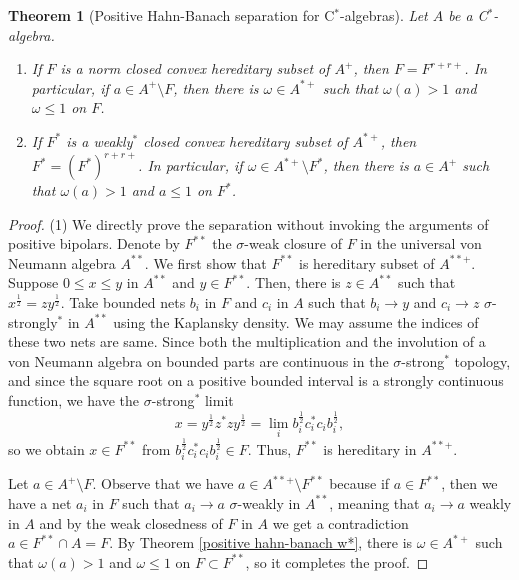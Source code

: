 \documentclass[a4paper]{amsart}
\theoremstyle{plain}
\newtheorem{thm}{Theorem}[section]
\theoremstyle{definition}
\begin{document}
\begin{thm}[Positive Hahn-Banach separation for C$^*$-algebras]
Let $A$ be a C$^*$-algebra.
\begin{enumerate}
\item If $F$ is a norm closed convex hereditary subset of $A^+$, then $F=F^{r+r+}$. In particular, if $a\in A^+\setminus F$, then there is $\omega\in A^{*+}$ such that $\omega(a)>1$ and $\omega\le1$ on $F$.
\item If $F^*$ is a weakly$^*$ closed convex hereditary subset of $A^{*+}$, then $F^*=(F^*)^{r+r+}$. In particular, if $\omega\in A^{*+}\setminus F^*$, then there is $a\in A^+$ such that $\omega(a)>1$ and $a\le1$ on $F^*$.
\end{enumerate}
\end{thm}
\begin{proof}
(1)
We directly prove the separation without invoking the arguments of positive bipolars.
Denote by $F^{**}$ the $\sigma$-weak closure of $F$ in the universal von Neumann algebra $A^{**}$.
We first show that $F^{**}$ is hereditary subset of $A^{**+}$.
Suppose $0\le x\le y$ in $A^{**}$ and $y\in F^{**}$.
Then, there is $z\in A^{**}$ such that $x^{\frac12}=zy^{\frac12}$.
Take bounded nets $b_i$ in $F$ and $c_i$ in $A$ such that $b_i\to y$ and $c_i\to z$ $\sigma$-strongly$^*$ in $A^{**}$ using the Kaplansky density.
We may assume the indices of these two nets are same.
Since both the multiplication and the involution of a von Neumann algebra on bounded parts are continuous in the $\sigma$-strong$^*$ topology, and since the square root on a positive bounded interval is a strongly continuous function, we have the $\sigma$-strong$^*$ limit
\[x=y^{\frac12}z^*zy^{\frac12}=\lim_ib_i^{\frac12}c_i^*c_ib_i^{\frac12},\]
so we obtain $x\in F^{**}$ from $b_i^{\frac12}c_i^*c_ib_i^{\frac12}\in F$.
Thus, $F^{**}$ is hereditary in $A^{**+}$.

Let $a\in A^+\setminus F$.
Observe that we have $a\in A^{**+}\setminus F^{**}$ because if $a\in F^{**}$, then we have a net $a_i$ in $F$ such that $a_i\to a$ $\sigma$-weakly in $A^{**}$, meaning that $a_i\to a$ weakly in $A$ and by the weak closedness of $F$ in $A$ we get a contradiction $a\in F^{**}\cap A=F$.
By Theorem \ref{positive hahn-banach w*}, there is $\omega\in A^{*+}$ such that $\omega(a)>1$ and $\omega\le1$ on $F\subset F^{**}$, so it completes the proof.


\end{proof}
\end{document}
